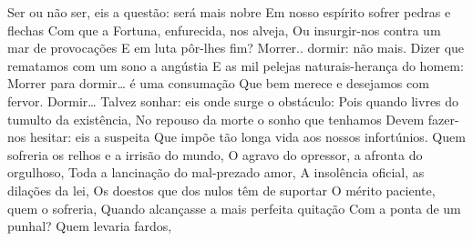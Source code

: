 \label{secintro}

Ser ou não ser, eis a questão: será mais nobre
Em nosso espírito sofrer pedras e flechas
Com que a Fortuna, enfurecida, nos alveja,
Ou insurgir-nos contra um mar de provocações
E em luta pôr-lhes fim? Morrer.. dormir: não mais.
Dizer que rematamos com um sono a angústia
E as mil pelejas naturais-herança do homem:
Morrer para dormir… é uma consumação
Que bem merece e desejamos com fervor.
Dormir… Talvez sonhar: eis onde surge o obstáculo:
Pois quando livres do tumulto da existência,
No repouso da morte o sonho que tenhamos
Devem fazer-nos hesitar: eis a suspeita
Que impõe tão longa vida aos nossos infortúnios.
Quem sofreria os relhos e a irrisão do mundo,
O agravo do opressor, a afronta do orgulhoso,
Toda a lancinação do mal-prezado amor,
A insolência oficial, as dilações da lei,
Os doestos que dos nulos têm de suportar
O mérito paciente, quem o sofreria,
Quando alcançasse a mais perfeita quitação
Com a ponta de um punhal? Quem levaria fardos,





